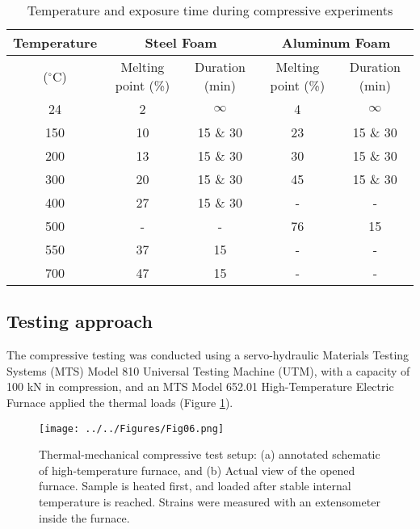 \documentclass[review]{elsarticle}
\begin{document}
\begin{table}[htbp]
	\centering
	\caption{Temperature and exposure time during compressive experiments}
	\begin{tabular}{ccccc}
		\toprule
		{Temperature} & \multicolumn{2}{c}{Steel Foam}  & \multicolumn{2}{c}{Aluminum Foam} \\
		\midrule
		($^{\circ}\mathrm{C}$) & Melting point (\%) & Duration (min) & Melting point (\%) & Duration (min) \\
		\midrule
		24    & 2     & $\infty$     & 4     & $\infty$ \\
		150   & 10    & 15 \& 30 & 23    & 15 \& 30 \\
		200   & 13    & 15 \& 30 & 30    & 15 \& 30 \\
		300   & 20    & 15 \& 30 & 45    & 15 \& 30 \\
		400   & 27    & 15 \& 30 & -     & - \\
		500   & -     & -     & 76    & 15 \\
		550   & 37    & 15    & -     & - \\
		700   & 47    & 15    & -     & - \\
		\bottomrule
	\end{tabular}%
	\label{Tab1}%
\end{table}%

\subsection{Testing approach}

The compressive testing was conducted using a servo-hydraulic Materials Testing Systems (MTS) Model 810 Universal Testing Machine (UTM), with a capacity of 100 kN in compression, and an MTS Model 652.01 High-Temperature Electric Furnace applied the thermal loads (Figure \ref{MTSFurnace}). 

\begin{figure}[htbp]
	\begin{center}
		\texttt{[image: ../../Figures/Fig06.png]}
		\caption{Thermal-mechanical compressive test setup: (a) annotated schematic of high-temperature furnace, and (b) Actual view of the opened furnace. Sample is heated first, and loaded after stable internal temperature is reached. Strains were measured with an extensometer inside the furnace.}
		\label{MTSFurnace}
	\end{center}
\end{figure}
\end{document}
